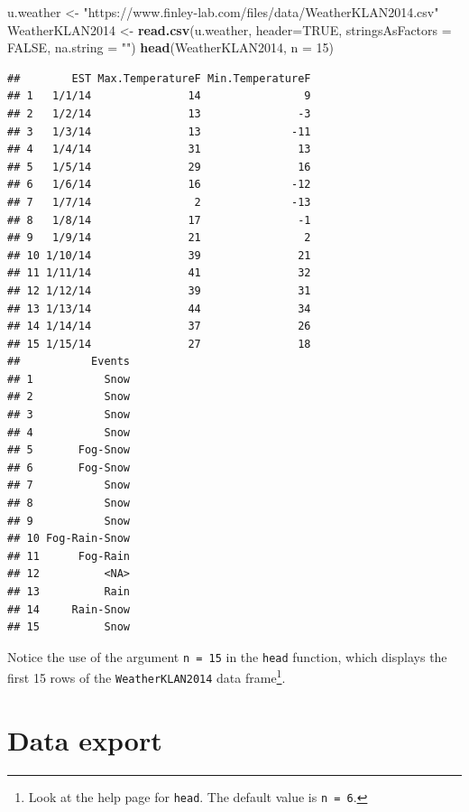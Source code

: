 \documentclass[
]{krantz}
\newenvironment{Shaded}{\begin{snugshade}}{\end{snugshade}}
\newcommand{\DataTypeTok}[1]{\textcolor[rgb]{0.13,0.29,0.53}{#1}}
\newcommand{\DecValTok}[1]{\textcolor[rgb]{0.00,0.00,0.81}{#1}}
\newcommand{\KeywordTok}[1]{\textcolor[rgb]{0.13,0.29,0.53}{\textbf{#1}}}
\newcommand{\NormalTok}[1]{#1}
\newcommand{\OtherTok}[1]{\textcolor[rgb]{0.56,0.35,0.01}{#1}}
\newcommand{\StringTok}[1]{\textcolor[rgb]{0.31,0.60,0.02}{#1}}
\begin{document}
\begin{Shaded}
\begin{Highlighting}[]
\NormalTok{u.weather \textless{}{-}}\StringTok{ "https://www.finley{-}lab.com/files/data/WeatherKLAN2014.csv"}
\NormalTok{WeatherKLAN2014 \textless{}{-}}\StringTok{ }\KeywordTok{read.csv}\NormalTok{(u.weather, }\DataTypeTok{header=}\OtherTok{TRUE}\NormalTok{,}
                            \DataTypeTok{stringsAsFactors =} \OtherTok{FALSE}\NormalTok{, }\DataTypeTok{na.string =} \StringTok{""}\NormalTok{)}
\KeywordTok{head}\NormalTok{(WeatherKLAN2014, }\DataTypeTok{n =} \DecValTok{15}\NormalTok{)}
\end{Highlighting}
\end{Shaded}

\begin{verbatim}
##        EST Max.TemperatureF Min.TemperatureF
## 1   1/1/14               14                9
## 2   1/2/14               13               -3
## 3   1/3/14               13              -11
## 4   1/4/14               31               13
## 5   1/5/14               29               16
## 6   1/6/14               16              -12
## 7   1/7/14                2              -13
## 8   1/8/14               17               -1
## 9   1/9/14               21                2
## 10 1/10/14               39               21
## 11 1/11/14               41               32
## 12 1/12/14               39               31
## 13 1/13/14               44               34
## 14 1/14/14               37               26
## 15 1/15/14               27               18
##           Events
## 1           Snow
## 2           Snow
## 3           Snow
## 4           Snow
## 5       Fog-Snow
## 6       Fog-Snow
## 7           Snow
## 8           Snow
## 9           Snow
## 10 Fog-Rain-Snow
## 11      Fog-Rain
## 12          <NA>
## 13          Rain
## 14     Rain-Snow
## 15          Snow
\end{verbatim}

Notice the use of the argument \texttt{n\ =\ 15} in the \texttt{head} function, which displays the first 15 rows of the \texttt{WeatherKLAN2014} data frame\footnote{Look at the help page for \texttt{head}. The default value is \texttt{n\ =\ 6}.}.

\hypertarget{data-export}{%
\section{Data export}\label{data-export}}
\end{document}

